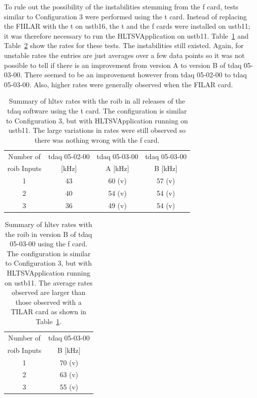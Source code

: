 \par To rule out the possibility of the instabilities stemming from the \acrshort{f} card, 
tests similar to Configuration 3 were performed using the \acrshort{t} card. Instead of 
replacing the FIILAR with the \acrshort{t} on ustb16, the \acrshort{t}  and 
the \acrshort{f} cards were installed on ustb11; it was therefore necessary to run the HLTSVApplication on ustb11. 
Table~\ref{tilar} and Table~\ref{filar11} show the rates for these tests. The instabilities 
still existed. Again, for unstable rates the entries are just averages over a few data 
points so it was not possible to tell if there is an improvement from version A to version B of 
tdaq 05-03-00. There seemed to be an improvement however from tdaq 05-02-00 to tdaq 05-03-00. 
Also, higher rates were generally observed when the FILAR card. 

\begin{table}[!h]
\begin{center}
\begin{tabular}{c|c|c|c}
 Number of   & tdaq 05-02-00 & tdaq 05-03-00 & tdaq 05-03-00 \\
 \acrshort{roib} Inputs & [kHz]         &  A [kHz]    & B [kHz] \\
\hline\hline
 1    & 43 & 60 (v) & 57 (v) \\
 2    & 40 & 54 (v) & 54 (v) \\ 
 3    & 36 & 49 (v) & 54 (v)
\end{tabular}
\end{center}
\caption{Summary of \acrshort{hltsv} rates with the \acrshort{roib} in all releases 
of the tdaq software using the \acrshort{t} card. The configuration is similar to 
Configuration 3, but with HLTSVApplication running on ustb11. The large variations in 
rates were still observed so there was nothing wrong with the \acrshort{f} card.}
\label{tilar}
\end{table}

\begin{table}[!h]
\begin{center}
\begin{tabular}{c|c}
 Number of    & tdaq 05-03-00 \\
 \acrshort{roib} Inputs  & B [kHz] \\
\hline\hline
 1     & 70 (v) \\
 2     & 63 (v) \\ 
 3     & 55 (v)
\end{tabular}
\end{center}
\caption{Summary of \acrshort{hltsv} rates with the \acrshort{roib} in version B of 
tdaq 05-03-00 using the \acrshort{f} card. The configuration is similar to Configuration 3, 
but with HLTSVApplication running on ustb11. The average rates observed 
are larger than those observed with a TILAR card as shown in Table~\ref{tilar}.}
\label{filar11}
\end{table}

